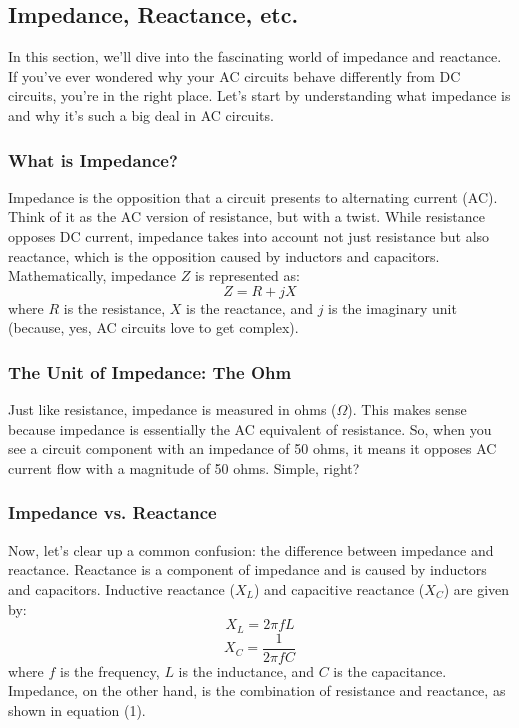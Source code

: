 \subsection{Impedance, Reactance, etc.}
\label{subsec:imp-react}

In this section, we’ll dive into the fascinating world of impedance and reactance. If you’ve ever wondered why your AC circuits behave differently from DC circuits, you’re in the right place. Let’s start by understanding what impedance is and why it’s such a big deal in AC circuits.

\subsubsection*{What is Impedance?}
Impedance is the opposition that a circuit presents to alternating current (AC). Think of it as the AC version of resistance, but with a twist. While resistance opposes DC current, impedance takes into account not just resistance but also reactance, which is the opposition caused by inductors and capacitors. Mathematically, impedance \( Z \) is represented as:
\begin{equation}
    Z = R + jX
\end{equation}
where \( R \) is the resistance, \( X \) is the reactance, and \( j \) is the imaginary unit (because, yes, AC circuits love to get complex).

\subsubsection*{The Unit of Impedance: The Ohm}
Just like resistance, impedance is measured in ohms (\( \Omega \)). This makes sense because impedance is essentially the AC equivalent of resistance. So, when you see a circuit component with an impedance of 50 ohms, it means it opposes AC current flow with a magnitude of 50 ohms. Simple, right?

\subsubsection*{Impedance vs. Reactance}
Now, let’s clear up a common confusion: the difference between impedance and reactance. Reactance is a component of impedance and is caused by inductors and capacitors. Inductive reactance (\( X_L \)) and capacitive reactance (\( X_C \)) are given by:
\begin{equation}
    X_L = 2\pi f L
\end{equation}
\begin{equation}
    X_C = \frac{1}{2\pi f C}
\end{equation}
where \( f \) is the frequency, \( L \) is the inductance, and \( C \) is the capacitance. Impedance, on the other hand, is the combination of resistance and reactance, as shown in equation (1).


